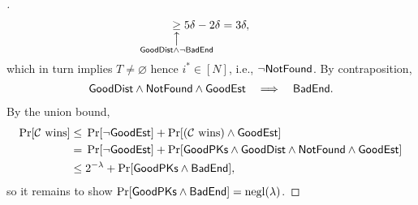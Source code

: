 \begin{proof}[]
\begin{align*}
\underset{\mathclap{\substack{
\big\uparrow\\\GoodDist\wedge\neg\BadEnd\vphantom{G}
}}}{\geq}
5\delta-2\delta
=
3\delta,
\end{align*}
which in turn implies ${T\neq\varnothing}$ hence ${i^\ast\in[N]}$, i.e.,
${\neg\NotFound}$.
By contraposition,
\begin{align*}
\GoodDist\wedge\NotFound\wedge\GoodEst
\quad\Longrightarrow\quad
\BadEnd.
\end{align*}
By the union bound,
\begin{align*}
\Pr[\scriptC\textup{ wins}]
\leq{}&
\Pr[\neg\GoodEst]
+
\Pr[(\scriptC\textup{ wins})\wedge\GoodEst]
\\{}={}&
\Pr[\neg\GoodEst]
+
\Pr[\GoodPKs\wedge\GoodDist\wedge\NotFound\wedge\GoodEst]
\\{}\leq{}&
2^{-\lambda}
+
\Pr[\GoodPKs\wedge\BadEnd],
\end{align*}
so it remains to show ${\Pr[\GoodPKs\wedge\BadEnd]=\negl(\lambda)}$.


\end{proof}
